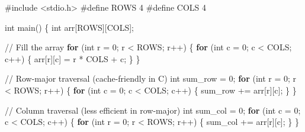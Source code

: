 \documentclass[
  letterpaper,
  DIV=11,
  numbers=noendperiod]{scrreprt}
\newenvironment{Shaded}{\begin{snugshade}}{\end{snugshade}}
\newcommand{\CommentTok}[1]{\textcolor[rgb]{0.37,0.37,0.37}{#1}}
\newcommand{\ControlFlowTok}[1]{\textcolor[rgb]{0.00,0.23,0.31}{\textbf{#1}}}
\newcommand{\DataTypeTok}[1]{\textcolor[rgb]{0.68,0.00,0.00}{#1}}
\newcommand{\DecValTok}[1]{\textcolor[rgb]{0.68,0.00,0.00}{#1}}
\newcommand{\ImportTok}[1]{\textcolor[rgb]{0.00,0.46,0.62}{#1}}
\newcommand{\NormalTok}[1]{\textcolor[rgb]{0.00,0.23,0.31}{#1}}
\newcommand{\OperatorTok}[1]{\textcolor[rgb]{0.37,0.37,0.37}{#1}}
\newcommand{\PreprocessorTok}[1]{\textcolor[rgb]{0.68,0.00,0.00}{#1}}
\begin{document}
\begin{Shaded}
\begin{Highlighting}[]
\PreprocessorTok{\#include }\ImportTok{\textless{}stdio.h\textgreater{}}
\PreprocessorTok{\#define ROWS }\DecValTok{4}
\PreprocessorTok{\#define COLS }\DecValTok{4}

\DataTypeTok{int}\NormalTok{ main}\OperatorTok{()} \OperatorTok{\{}
    \DataTypeTok{int}\NormalTok{ arr}\OperatorTok{[}\NormalTok{ROWS}\OperatorTok{][}\NormalTok{COLS}\OperatorTok{];}

    \CommentTok{// Fill the array}
    \ControlFlowTok{for} \OperatorTok{(}\DataTypeTok{int}\NormalTok{ r }\OperatorTok{=} \DecValTok{0}\OperatorTok{;}\NormalTok{ r }\OperatorTok{\textless{}}\NormalTok{ ROWS}\OperatorTok{;}\NormalTok{ r}\OperatorTok{++)} \OperatorTok{\{}
        \ControlFlowTok{for} \OperatorTok{(}\DataTypeTok{int}\NormalTok{ c }\OperatorTok{=} \DecValTok{0}\OperatorTok{;}\NormalTok{ c }\OperatorTok{\textless{}}\NormalTok{ COLS}\OperatorTok{;}\NormalTok{ c}\OperatorTok{++)} \OperatorTok{\{}
\NormalTok{            arr}\OperatorTok{[}\NormalTok{r}\OperatorTok{][}\NormalTok{c}\OperatorTok{]} \OperatorTok{=}\NormalTok{ r }\OperatorTok{*}\NormalTok{ COLS }\OperatorTok{+}\NormalTok{ c}\OperatorTok{;}
        \OperatorTok{\}}
    \OperatorTok{\}}

    \CommentTok{// Row{-}major traversal (cache{-}friendly in C)}
    \DataTypeTok{int}\NormalTok{ sum\_row }\OperatorTok{=} \DecValTok{0}\OperatorTok{;}
    \ControlFlowTok{for} \OperatorTok{(}\DataTypeTok{int}\NormalTok{ r }\OperatorTok{=} \DecValTok{0}\OperatorTok{;}\NormalTok{ r }\OperatorTok{\textless{}}\NormalTok{ ROWS}\OperatorTok{;}\NormalTok{ r}\OperatorTok{++)} \OperatorTok{\{}
        \ControlFlowTok{for} \OperatorTok{(}\DataTypeTok{int}\NormalTok{ c }\OperatorTok{=} \DecValTok{0}\OperatorTok{;}\NormalTok{ c }\OperatorTok{\textless{}}\NormalTok{ COLS}\OperatorTok{;}\NormalTok{ c}\OperatorTok{++)} \OperatorTok{\{}
\NormalTok{            sum\_row }\OperatorTok{+=}\NormalTok{ arr}\OperatorTok{[}\NormalTok{r}\OperatorTok{][}\NormalTok{c}\OperatorTok{];}
        \OperatorTok{\}}
    \OperatorTok{\}}

    \CommentTok{// Column traversal (less efficient in row{-}major)}
    \DataTypeTok{int}\NormalTok{ sum\_col }\OperatorTok{=} \DecValTok{0}\OperatorTok{;}
    \ControlFlowTok{for} \OperatorTok{(}\DataTypeTok{int}\NormalTok{ c }\OperatorTok{=} \DecValTok{0}\OperatorTok{;}\NormalTok{ c }\OperatorTok{\textless{}}\NormalTok{ COLS}\OperatorTok{;}\NormalTok{ c}\OperatorTok{++)} \OperatorTok{\{}
        \ControlFlowTok{for} \OperatorTok{(}\DataTypeTok{int}\NormalTok{ r }\OperatorTok{=} \DecValTok{0}\OperatorTok{;}\NormalTok{ r }\OperatorTok{\textless{}}\NormalTok{ ROWS}\OperatorTok{;}\NormalTok{ r}\OperatorTok{++)} \OperatorTok{\{}
\NormalTok{            sum\_col }\OperatorTok{+=}\NormalTok{ arr}\OperatorTok{[}\NormalTok{r}\OperatorTok{][}\NormalTok{c}\OperatorTok{];}
        \OperatorTok{\}}
    \OperatorTok{\}}


\end{Highlighting}
\end{Shaded}
\end{document}
